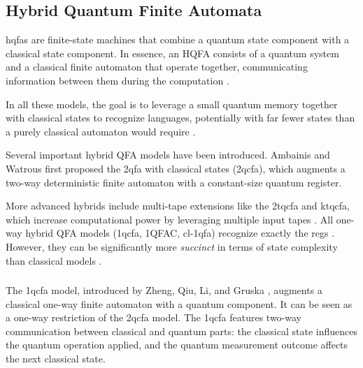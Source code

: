 \subsection{Hybrid Quantum Finite Automata}
\label{sec:hybrid-qfa}

\glspl{hqfa} are finite-state machines that combine a quantum state component with a classical state component. In essence, an HQFA consists of a quantum system and a classical finite automaton that operate together, communicating information between them during the computation \cite{li2015hybrid}.

In all these models, the goal is to leverage a small quantum memory together with classical states to recognize languages, potentially with far fewer states than a purely classical automaton would require \cite{zheng2012one}.

Several important hybrid QFA models have been introduced. Ambainis and Watrous \cite{ambainis2002two} first proposed the \gls{2qfa} with classical states (\gls{2qcfa}), which augments a two-way deterministic finite automaton with a constant-size quantum register. 

More advanced hybrids include multi-tape extensions like the \gls{2tqcfa} and \gls{ktqcfa}, which increase computational power by leveraging multiple input tapes \cite{zheng2011two}. All one-way hybrid QFA models (\gls{1qcfa}, 1QFAC, \gls{cl-1qfa}) recognize exactly the \glspl{reg} \cite{li2015hybrid, zheng2012one}. However, they can be significantly more \textit{succinct} in terms of state complexity than classical models \cite{xiao2021state}.

\subsubsection{}

The \gls{1qcfa} model, introduced by Zheng, Qiu, Li, and Gruska \cite{zheng2012one}, augments a classical one-way finite automaton with a quantum component. It can be seen as a one-way restriction of the \gls{2qcfa} model. The \gls{1qcfa} features two-way communication between classical and quantum parts: the classical state influences the quantum operation applied, and the quantum measurement outcome affects the next classical state.

